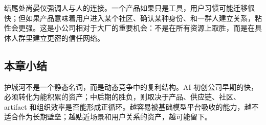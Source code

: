 结尾处尚晏仪强调人与人的连接。一个产品如果只是工具，用户习惯可能迁移很快；但如果产品意味着用户进入某个社区、确认某种身份、和一群人建立关系，粘性会更强。这是小公司相对于大厂的重要机会：不是在所有资源上取胜，而是在具体人群里建立更密的信任网络。

\subsection{本章小结}

护城河不是一个静态名词，而是动态竞争中的复利结构。AI 初创公司早期的快，必须转化为能积累的资产；中后期的胜负，则取决于产品、供应链、社区、artifact 和组织效率是否能形成正循环。越容易被基础模型平台吸收的能力，越不适合作为长期壁垒；越贴近场景和用户关系的资产，越可能留下。


